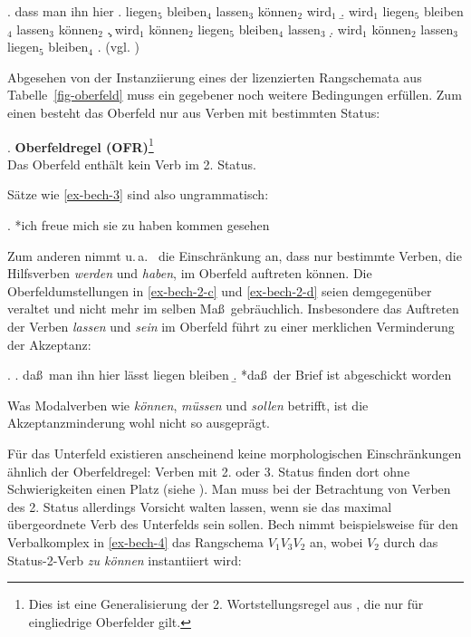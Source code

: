 \ex. dass man ihn hier \label{ex-bech-2}
\a. liegen$_5$ bleiben$_4$ lassen$_3$ können$_2$ wird$_1$
\b. wird$_1$ liegen$_5$ bleiben$_4$ lassen$_3$ können$_2$ 
\c. wird$_1$ können$_2$ liegen$_5$ bleiben$_4$ lassen$_3$  \label{ex-bech-2-c}
\d. wird$_1$ können$_2$ lassen$_3$ liegen$_5$ bleiben$_4$  \label{ex-bech-2-d}
\z. (vgl. \citealt[\S 61]{Bech:55})  

Abgesehen von der Instanziierung eines der lizenzierten Rangschemata aus Tabelle~\ref{fig-oberfeld} muss ein gegebener  noch weitere Bedingungen erfüllen. Zum einen besteht das Oberfeld nur aus Verben mit bestimmten Status: 

\ex. \label{ex-ofr} \textbf{Oberfeldregel (OFR)}\footnote{Dies ist eine Generalisierung der 2. Wortstellungsregel aus \citet[\S 11]{Bech:63}, die nur für eingliedrige Oberfelder gilt.} \\
Das Oberfeld enthält kein Verb im 2. Status.

Sätze wie \ref{ex-bech-3} sind also ungrammatisch:

\ex. *ich freue mich sie zu haben kommen gesehen \hfill \citep[\S 11]{Bech:63}\label{ex-bech-3}

Zum anderen nimmt u.\,a.\ \citet[75ff]{Meurers:99} die Einschränkung an, dass nur bestimmte Verben, die Hilfsverben {\it werden} und {\it haben}, im Oberfeld auftreten können. Die Oberfeldumstellungen in \ref{ex-bech-2-c} und \ref{ex-bech-2-d} seien demgegenüber veraltet und nicht mehr im selben Ma\ss \ gebräuchlich. Insbesondere das Auftreten der Verben {\it lassen} und {\it sein} im Oberfeld führt zu einer merklichen Verminderung der Akzeptanz:

\ex. 
\a. da\ss \ man ihn hier lässt liegen bleiben \hfill \citep[\S 61]{Bech:55} 
\b. *da\ss \ der Brief ist abgeschickt worden \hfill \citep[(125a)]{Meurers:99}

Was Modalverben wie {\it können}, {\it müssen} und {\it sollen} betrifft, ist die Akzeptanzminderung wohl nicht so ausgeprägt. 

Für das Unterfeld existieren anscheinend keine morphologischen Einschränkungen ähnlich der Oberfeldregel: Verben mit 2. oder 3. Status finden dort ohne Schwierigkeiten einen Platz (siehe \citealt[80ff]{Meurers:99}). Man muss bei der Betrachtung von Verben des 2. Status allerdings Vorsicht walten lassen, wenn sie das maximal übergeordnete Verb des Unterfelds sein sollen. Bech nimmt beispielsweise für den Verbalkomplex  in \ref{ex-bech-4} das Rangschema $V_1 V_3 V_2$ an, wobei $V_2$ durch das Status-2-Verb {\it zu können} instantiiert wird:

